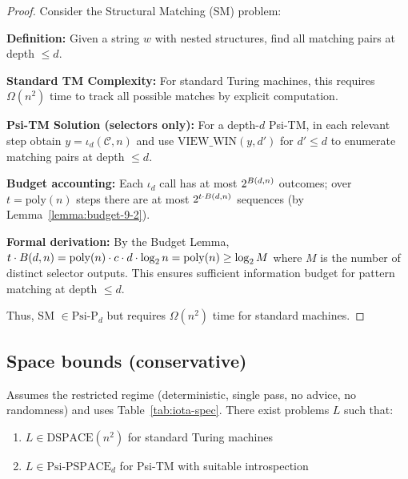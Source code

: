 \begin{proof}
Consider the Structural Matching (SM) problem:

\textbf{Definition:} Given a string $w$ with nested structures, find all matching pairs at depth $\leq d$.

\textbf{Standard TM Complexity:}
For standard Turing machines, this requires $\Omega(n^2)$ time to track all possible matches by explicit computation.

\textbf{Psi-TM Solution (selectors only):}
For a depth-$d$ Psi-TM, in each relevant step obtain $y=\iota_d(\mathcal{C},n)$ and use $\mathrm{VIEW\_WIN}(y,d')$ for $d'\le d$ to enumerate matching pairs at depth $\le d$.

\textbf{Budget accounting:}
Each $\iota_d$ call has at most $2^{\B(d,n)}$ outcomes; over $t=\mathrm{poly}(n)$ steps there are at most $2^{t \cdot \B(d,n)}$ sequences (by Lemma~\ref{lemma:budget-9-2}).

\textbf{Formal derivation:} By the Budget Lemma, $t \cdot \B(d,n) = \mathrm{poly}(n) \cdot c \cdot d \cdot \log_{2} n = \mathrm{poly}(n) \ge \log_{2} M$ where $M$ is the number of distinct selector outputs. This ensures sufficient information budget for pattern matching at depth $\le d$.

Thus, SM $\in \text{Psi-P}_d$ but requires $\Omega(n^2)$ time for standard machines.
\end{proof}

\subsection{Space bounds (conservative)}

\begin{theorem}
Assumes the restricted regime (deterministic, single pass, no advice, no randomness) and uses Table~\ref{tab:iota-spec}.
There exist problems $L$ such that:
\begin{enumerate}
\item $L \in \text{DSPACE}(n^2)$ for standard Turing machines
\item $L \in \text{Psi-PSPACE}_d$ for Psi-TM with suitable introspection
\end{enumerate}
\end{theorem}

